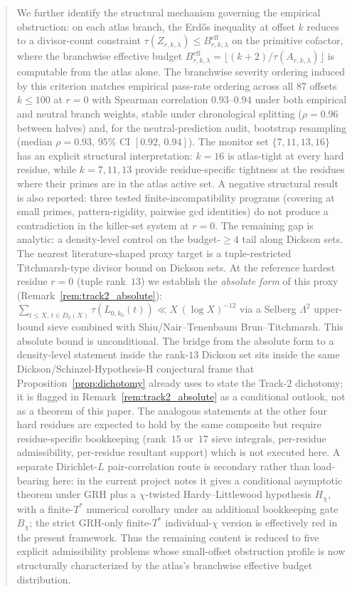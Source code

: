 \documentclass[11pt]{article}
\renewcommand{\_}{\origunderscore\allowbreak}
\theoremstyle{definition}
\theoremstyle{remark}
\begin{document}
\begin{abstract}
We further identify the structural mechanism governing the
empirical obstruction: on each atlas branch, the Erd\H{o}s
inequality at offset $k$ reduces to a divisor-count constraint
$\tau(Z_{r,k,\lambda}) \le B^{\mathrm{eff}}_{r,k,\lambda}$ on the
primitive cofactor, where the branchwise effective budget
$B^{\mathrm{eff}}_{r,k,\lambda} = \lfloor (k+2)/\tau(A_{r,k,\lambda})\rfloor$
is computable from the atlas alone. The branchwise severity
ordering induced by this criterion matches empirical pass-rate
ordering across all $87$ offsets $k\le 100$ at $r=0$ with Spearman
correlation $0.93$--$0.94$ under both empirical and neutral
branch weights, stable under chronological splitting
($\rho = 0.96$ between halves) and, for the neutral-prediction audit,
bootstrap resampling (median $\rho = 0.93$, $95\%$ CI
$[0.92,\,0.94]$). The monitor set $\{7,11,13,16\}$ has
an explicit structural interpretation: $k=16$ is atlas-tight at
every hard residue, while $k=7,11,13$ provide residue-specific
tightness at the residues where their primes are in the atlas
active set. A negative structural result is also reported: three
tested finite-incompatibility programs (covering at small primes,
pattern-rigidity, pairwise gcd identities) do not produce a
contradiction in the killer-set system at $r=0$. The remaining
gap is analytic: a density-level control on the budget-$\ge 4$
tail along Dickson sets. The nearest literature-shaped proxy
target is a tuple-restricted Titchmarsh-type divisor bound on
Dickson sets. At the reference hardest residue $r=0$ (tuple
rank~$13$) we establish the \emph{absolute form} of this proxy
(Remark~\ref{rem:track2_absolute}):
$\sum_{t\le X,\,t\in D_0(X)} \tau(L_{0,k_0}(t)) \ll X\,(\log X)^{-12}$
via a Selberg $\Lambda^{2}$ upper-bound sieve combined with
Shiu/Nair--Tenenbaum Brun--Titchmarsh. This absolute bound is
unconditional. The bridge from the absolute form to a density-level
statement inside the rank-$13$ Dickson set sits inside the same
Dickson/Schinzel-Hypothesis-H conjectural frame that
Proposition~\ref{prop:dichotomy} already uses to state the Track-$2$
dichotomy; it is flagged in Remark~\ref{rem:track2_absolute} as a
conditional outlook, not as a theorem of this paper. The analogous statements at
the other four hard residues are expected to hold
by the same composite but require residue-specific bookkeeping
(rank~$15$ or~$17$ sieve integrals, per-residue admissibility,
per-residue resultant support) which is not executed here.
A separate Dirichlet-$L$
pair-correlation route is secondary rather than load-bearing
here: in the current project notes it gives a conditional
asymptotic theorem under GRH plus a $\chi$-twisted
Hardy--Littlewood hypothesis $H_\chi$, with a finite-$T^*$
numerical corollary under an additional bookkeeping gate $B_\chi$;
the strict GRH-only finite-$T^*$ individual-$\chi$ version is
effectively red in the present framework. Thus the remaining
content is reduced to five explicit admissibility problems whose
small-offset obstruction profile is now structurally characterized
by the atlas's branchwise effective budget distribution.
\end{abstract}
\end{document}
